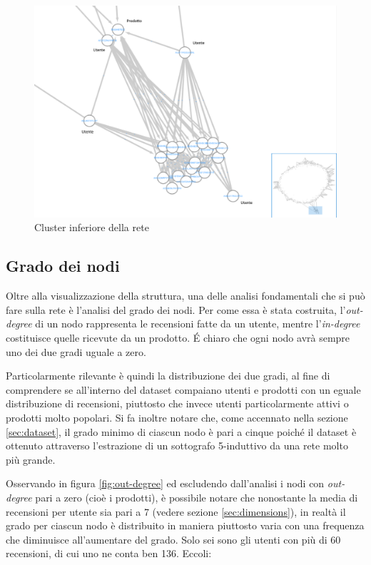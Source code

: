 \documentclass[hidelinks, 12pt]{article}
\begin{document}
\begin{figure}[H]
	\centering
	\includegraphics[scale=0.36]{images/03_03_cyto_net_3.png}
	\caption[Cluster inferiore della rete]{Cluster inferiore della rete}
	\label{fig:cyto-net-3}
\end{figure}



\subsection{Grado dei nodi}
\label{sec:nodes-degree}

Oltre alla visualizzazione della struttura, una delle analisi fondamentali che si può fare sulla rete è l'analisi del grado dei nodi. Per come essa è stata costruita, l'\textit{out-degree} di un nodo rappresenta le recensioni fatte da un utente, mentre l'\textit{in-degree} costituisce quelle ricevute da un prodotto. É chiaro che ogni nodo avrà sempre uno dei due gradi uguale a zero.

Particolarmente rilevante è quindi la distribuzione dei due gradi, al fine di comprendere se all'interno del dataset compaiano utenti e prodotti con un eguale distribuzione di recensioni, piuttosto che invece utenti particolarmente attivi o prodotti molto popolari. Si fa inoltre notare che, come accennato nella sezione \ref{sec:dataset}, il grado minimo di ciascun nodo è pari a cinque poiché il dataset è ottenuto attraverso l'estrazione di un sottografo 5-induttivo da una rete molto più grande.

Osservando in figura \ref{fig:out-degree} ed escludendo dall'analisi i nodi con \textit{out-degree} pari a zero (cioè i prodotti), è possibile notare che nonostante la media di recensioni per utente sia pari a 7 (vedere sezione \ref{sec:dimensions}), in realtà il grado per ciascun nodo è distribuito in maniera piuttosto varia con una frequenza che diminuisce all'aumentare del grado. Solo sei sono gli utenti con più di 60 recensioni, di cui uno ne conta ben 136. Eccoli:
\end{document}
